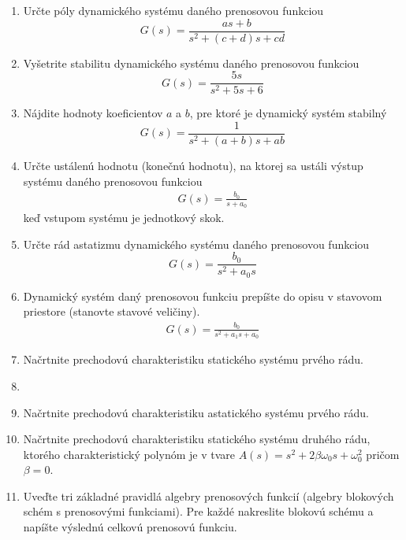 \documentclass[a4paper, 10pt, ]{article}
\begin{document}
\begin{enumerate}[leftmargin=0pt, labelsep=3mm, itemsep=0pt]
    \item Určte póly dynamického systému daného prenosovou funkciou
    \begin{equation*}
        G(s) = \frac{a s + b}{s^2 + (c+d) s + cd}
    \end{equation*}


    \item Vyšetrite stabilitu dynamického systému daného prenosovou funkciou
    \begin{equation*}
        G(s) = \frac{5 s }{s^2 + 5 s + 6}
    \end{equation*}

    \item Nájdite hodnoty koeficientov $a$ a $b$, pre ktoré je dynamický systém stabilný
    \begin{equation*}
        G(s) = \frac{1}{s^2 + (a+b) s + ab}
    \end{equation*}


    \item Určte ustálenú hodnotu (konečnú hodnotu), na ktorej sa ustáli výstup systému daného prenosovou funkciou
    \begin{align*}
        G(s) = \frac{b_0}{s + a_0}
    \end{align*}
    keď vstupom systému je jednotkový skok.


    \item Určte rád astatizmu dynamického systému daného prenosovou funkciou
    \begin{equation*}
        G(s) = \frac{b_0}{s^2 + a_0 s}
    \end{equation*}



    \item Dynamický systém daný prenosovou funkciu prepíšte do opisu v stavovom priestore (stanovte stavové veličiny).
    \begin{align*}
        G(s) = \frac{b_0}{s^2 + a_1 s + a_0}
    \end{align*}

    \item Načrtnite prechodovú charakteristiku statického systému prvého rádu.
    \item 
    \item Načrtnite prechodovú charakteristiku astatického systému prvého rádu.

    \item Načrtnite prechodovú charakteristiku statického systému druhého rádu, ktorého charakteristický polynóm je v tvare $A(s) = s^2 + 2 \beta \omega_0 s + \omega_0^2$ pričom $\beta = 0$.

    \item Uveďte tri základné pravidlá algebry prenosových funkcií (algebry blokových schém s prenosovými funkciami). Pre každé nakreslite blokovú schému a napíšte výslednú celkovú prenosovú funkciu.

\end{enumerate}







{}
% 

\end{document}
